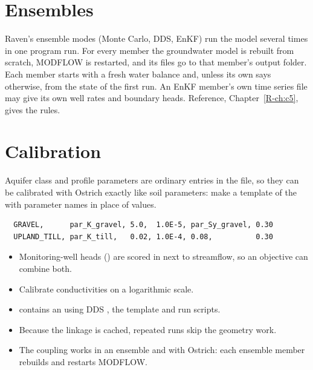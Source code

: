 \section{Ensembles}
Raven's ensemble modes (Monte Carlo, DDS, EnKF) run the model several times in one program run. For every member the
groundwater model is rebuilt from scratch, MODFLOW is restarted, and its files go to that member's output folder. Each
member starts with a fresh water balance and, unless its own  says otherwise, from the state of the first run.
An EnKF member's own time series file may give its own well rates and boundary heads. Reference, Chapter~\ref{R-ch:c5},
gives the rules.

\section{Calibration}\label{ch:calib}
Aquifer class and profile parameters are ordinary entries in the  file, so they can be calibrated with Ostrich
exactly like soil parameters: make a template of the  with parameter names in place of values.
\par\noindent\begin{minipage}{\linewidth}
\begin{lstlisting}
  GRAVEL,      par_K_gravel, 5.0,  1.0E-5, par_Sy_gravel, 0.30
  UPLAND_TILL, par_K_till,   0.02, 1.0E-4, 0.08,          0.30
\end{lstlisting}
\end{minipage}\par\smallskip
\begin{itemize}
\item Monitoring-well heads () are scored in  next to streamflow, so an
objective can combine both.
\item Calibrate conductivities on a logarithmic scale.
\item {} contains an  using DDS \cite{tolson2007dds}, the template and run scripts.
\item Because the linkage is cached, repeated runs skip the geometry work.
\item The coupling works in an ensemble and with Ostrich: each ensemble member rebuilds and restarts MODFLOW.
\end{itemize}

